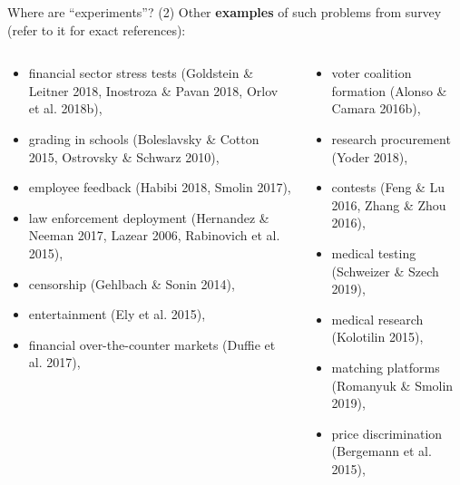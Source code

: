 \documentclass[english,10pt
,aspectratio=169
]{beamer}
\begin{document}
\begin{frame}{Where  are ``experiments''? (2)}
	Other \textbf{examples} of such problems from \cite{kamenica_bayesian_2019} survey (refer to it for exact references):
	\begin{columns}
		\begin{column}{0.5\linewidth}
			\begin{itemize}
				\footnotesize
				\item financial sector stress tests (Goldstein \& Leitner 2018, Inostroza \&
				Pavan 2018, Orlov et al. 2018b), 
				
				\item grading in schools (Boleslavsky \& Cotton 2015, Ostrovsky \&
				Schwarz 2010), 
				
				\item employee feedback (Habibi 2018, Smolin 2017), 
				
				\item law enforcement deployment (Hernandez \& Neeman 2017, Lazear 2006, Rabinovich et al. 2015), 
				
				\item censorship (Gehlbach \& Sonin 2014), 
				
				\item entertainment (Ely et al. 2015), 
				
				\item financial over-the-counter markets (Duffie et al. 2017),
			\end{itemize}
		\end{column}
		\begin{column}{0.5\linewidth}
			\begin{itemize}
				\footnotesize
				\item voter coalition formation (Alonso \& Camara 2016b), 
				
				\item research procurement (Yoder 2018), 
				
				\item contests (Feng \& Lu 2016, Zhang \& Zhou 2016), 
				
				\item medical testing (Schweizer \& Szech 2019), 
				
				\item medical research (Kolotilin 2015), 
				
				\item matching platforms (Romanyuk \& Smolin 2019), 
				
				\item price discrimination (Bergemann et al. 2015), 
				

\end{itemize}
\end{column}
\end{columns}
\end{frame}
\end{document}
